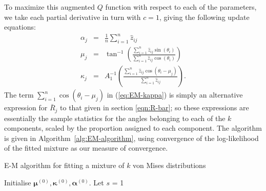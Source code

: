 \documentclass[../../ArchStats.tex]{subfiles}
\begin{document}
To maximize this augmented $Q$ function with respect to each of the parameters, we take each partial derivative in turn with $c=1$, giving the following update equations:
\begin{eqnarray}
\label{eq:EM-alpha}
\alpha_j &=& \frac{1}{n} \sum_{i=1}^n \hat{z}_{ij} \\[5pt]
\label{eq:EM-mu}
\mu_j &=& \tan^{-1} \left( \frac{\sum_{i=1}^n \hat{z}_{ij} \sin(\theta_i)}{\sum_{i=1}^n \hat{z}_{ij} \cos(\theta_i)} \right) \\[5pt]
\label{eq:EM-kappa}
\kappa_j &=& A_1^{-1} \left(\frac{\sum_{i=1}^n \hat{z}_{ij} \cos(\theta_i - \mu_j)}{\sum_{i=1}^n \hat{z}_{ij}}\right).
\end{eqnarray}
The term $\sum_{i=1}^n \cos(\theta_i - \mu_j)$ in (\ref{eq:EM-kappa}) is simply an alternative expression for $\bar{R}_j$ to that given in section \ref{eqn:R-bar}; so these expressions are essentially the sample statistics for the angles belonging to each of the $k$ components, scaled by the proportion assigned to each component. The algorithm is given in Algorithm~\ref{alg:EM-algorithm}, using convergence of the log-likelihood of the fitted mixture as our measure of convergence.

\begin{algorithm}[!ht]
    \caption{E-M algorithm for fitting a mixture of $k$ von Mises distributions}
	\label{alg:EM-algorithm}



Initialise $\boldsymbol{\mu}^{(0)}, \boldsymbol{\kappa}^{(0)}, \boldsymbol{\alpha}^{(0)}$. Let $s$ = 1\;

\end{algorithm}
\end{document}
